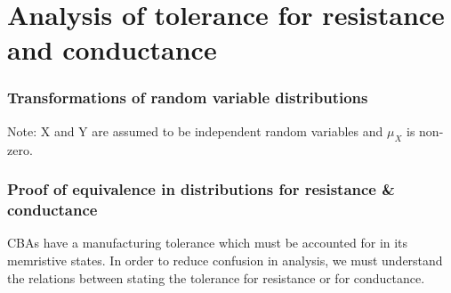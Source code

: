 
\chapter{Analysis of tolerance for resistance and conductance}
\label{appendix:rv_distribution}

\vspace{2em}


\subsection{Transformations of random variable distributions}


\noindent
Note: X and Y are assumed to be independent random variables and $\mu_X$ is non-zero.

\subsection{Proof of equivalence in distributions for resistance \& conductance}

\noindent
\Acfp{CBA} have a manufacturing tolerance which must be accounted for in its memristive states. In order to reduce confusion in analysis, we must understand the relations between stating the tolerance for resistance or for conductance.

